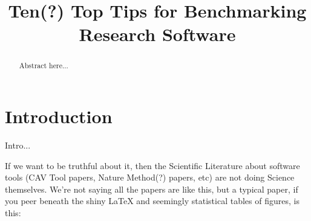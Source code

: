 \documentclass[conference]{IEEEtran}
\begin{document}
%
\title{Ten(?) Top Tips for Benchmarking Research Software}

\author{
\and
{}

\and

 }

\maketitle

\begin{abstract}
Abstract here...
\end{abstract}

\IEEEpeerreviewmaketitle

\section{Introduction}
Intro...

If we want to be truthful about it, then the Scientific Literature
about software tools (CAV Tool papers, Nature Method(?) papers, etc)
are not doing Science themselves. We're not saying all the papers are
like this, but a typical paper, if you peer beneath the shiny \LaTeX
and seemingly statistical tables of figures, is this:
\end{document}
